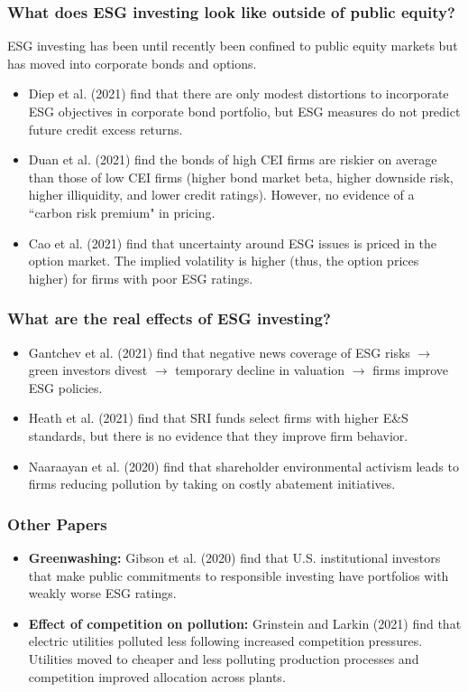 \documentclass[handout]{beamer}
\begin{document}
\begin{frame}
\frametitle{What does ESG investing look like outside of public equity?}
ESG investing has been until recently been confined to public equity markets but has moved into corporate bonds and options.
\bigskip
\begin{itemize}[<+->]
\item Diep et al. (2021) find that there are only modest distortions to incorporate ESG objectives in corporate bond portfolio, but ESG measures do not predict future credit excess returns. 
\bigskip
\item  Duan et al. (2021) find the bonds of high CEI firms are riskier on average than those of low CEI firms (higher bond market beta, higher downside risk, higher illiquidity, and lower credit ratings). However, no evidence of a ``carbon risk premium" in pricing.
\bigskip
\item Cao et al. (2021) find that uncertainty around ESG issues is priced in the option market.  The implied volatility is higher (thus, the option prices higher) for firms with poor ESG ratings.
\end{itemize}
\end{frame}



\begin{frame}
\frametitle{What are the real effects of ESG investing?}
\begin{itemize}[<+->]
\item Gantchev et al. (2021) find that negative news coverage of ESG risks $\rightarrow$ green investors divest $\rightarrow$ temporary decline in valuation $\rightarrow$ firms improve ESG policies.
\bigskip
\item Heath et al. (2021) find that SRI funds select firms with higher E\&S standards, but there is no evidence that they improve firm behavior.
\bigskip
\item Naaraayan et al. (2020) find that shareholder environmental activism leads to firms reducing pollution by taking on costly abatement initiatives.
\end{itemize}
\end{frame}



\begin{frame}
\frametitle{Other Papers}
\begin{itemize}[<+->]
\item \textbf{Greenwashing:} Gibson et al. (2020) find that U.S. institutional investors that make public commitments to responsible investing have portfolios with weakly worse ESG ratings.
\bigskip
\item \textbf{Effect of competition on pollution:} Grinstein and Larkin (2021) find that electric utilities polluted less following increased competition pressures. Utilities moved to cheaper and less polluting production processes and competition improved allocation across plants.
\end{itemize}
\end{frame}
\end{document}
